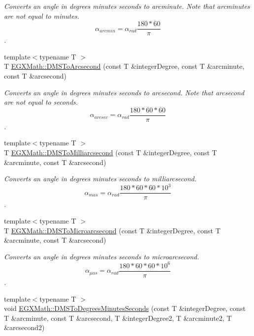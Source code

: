 \begin{DoxyCompactItemize}
\begin{DoxyCompactList}\small\item\em Converts an angle in degrees minutes seconds to arcminute. Note that arcminutes are not equal to minutes. \[\alpha_{arcmin}=\alpha_{rad}\frac{180 * 60}{\pi}\]. \end{DoxyCompactList}\item 
{\footnotesize template$<$typename T $>$ }\\T \mbox{\hyperlink{group___e_g_x_math-_angle_conversions-_d_m_s_gac9d0871ac2dd889cf9f3c00d25f8a013}{E\+G\+X\+Math\+::\+D\+M\+S\+To\+Arcsecond}} (const T \&integer\+Degree, const T \&arcminute, const T \&arcsecond)
\begin{DoxyCompactList}\small\item\em Converts an angle in degrees minutes seconds to arcsecond. Note that arcsecond are not equal to seconds. \[\alpha_{arcsec}=\alpha_{rad}\frac{180 * 60 * 60}{\pi}\]. \end{DoxyCompactList}\item 
{\footnotesize template$<$typename T $>$ }\\T \mbox{\hyperlink{group___e_g_x_math-_angle_conversions-_d_m_s_ga35a14699b2497a473f6a742ea2901557}{E\+G\+X\+Math\+::\+D\+M\+S\+To\+Milliarcsecond}} (const T \&integer\+Degree, const T \&arcminute, const T \&arcsecond)
\begin{DoxyCompactList}\small\item\em Converts an angle in degrees minutes seconds to milliarcsecond. \[\alpha_{mas}=\alpha_{rad}\frac{180 * 60 * 60 * 10^3}{\pi}\]. \end{DoxyCompactList}\item 
{\footnotesize template$<$typename T $>$ }\\T \mbox{\hyperlink{group___e_g_x_math-_angle_conversions-_d_m_s_ga1230f4c81771a59d9973beb0e6747dbf}{E\+G\+X\+Math\+::\+D\+M\+S\+To\+Microarcsecond}} (const T \&integer\+Degree, const T \&arcminute, const T \&arcsecond)
\begin{DoxyCompactList}\small\item\em Converts an angle in degrees minutes seconds to microarcsecond. \[\alpha_{\mu as}=\alpha_{rad}\frac{180 * 60 * 60 * 10^6}{\pi}\]. \end{DoxyCompactList}\item 
{\footnotesize template$<$typename T $>$ }\\void \mbox{\hyperlink{group___e_g_x_math-_angle_conversions-_d_m_s_gae8804d622399df85d60c0c8bb5c6ebc5}{E\+G\+X\+Math\+::\+D\+M\+S\+To\+Degrees\+Minutes\+Seconds}} (const T \&integer\+Degree, const T \&arcminute, const T \&arcsecond, T \&integer\+Degree2, T \&arcminute2, T \&arcsecond2)

\end{DoxyCompactItemize}
